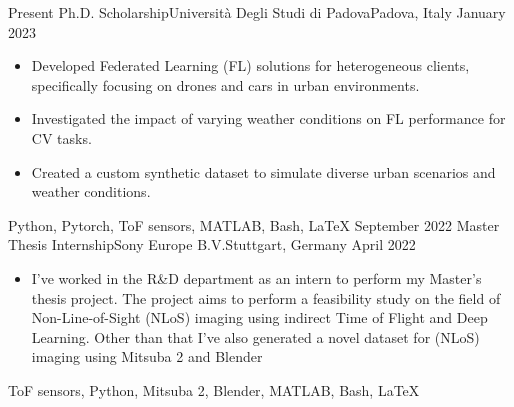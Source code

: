 %
%
%

\begin{experiences}
    \experience
        {Present}            {Ph.D. Scholarship}{Università Degli Studi di Padova}{Padova, Italy}
        {January 2023}       {\begin{itemize}
                                 \item Developed Federated Learning (FL) solutions for heterogeneous clients, specifically focusing on drones and cars in urban environments. 
                                 \item Investigated the impact of varying weather conditions on FL performance for CV tasks.
                                 \item Created a custom synthetic dataset to simulate diverse urban scenarios and weather conditions.
                             \end{itemize}
                            }
                            {Python, Pytorch, ToF sensors, MATLAB, Bash, \LaTeX}
    \experience
        {September 2022}    {Master Thesis Internship}{Sony Europe B.V.}{Stuttgart, Germany}
        {April 2022}        {\begin{itemize}
                                 \item I've worked in the R\&D department as an intern to perform my Master's thesis project. The project aims to perform a feasibility study on the field of Non-Line-of-Sight (NLoS) imaging using indirect Time of Flight and Deep Learning. Other than that I've also generated a novel dataset for (NLoS) imaging using Mitsuba 2 and Blender
                             \end{itemize}
                            }
                            {ToF sensors, Python, Mitsuba 2, Blender, MATLAB, Bash, \LaTeX}
                    
\end{experiences}
